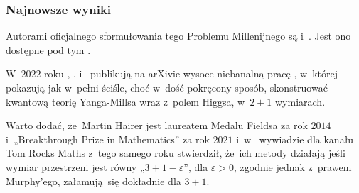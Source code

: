 \documentclass[10pt,t]{beamer}
\begin{document}
\begin{frame}
  \frametitle{Najnowsze wyniki}


  Autorami oficjalnego sformułowania tego Problemu Millenijnego
  są 
  i~.
  Jest ono dostępne pod tym
  .

  W~$2022$ roku
  ,
  ,
  i~ publikują
  na arXivie wysoce niebanalną pracę
  \parencite{Chandra-et-al-Stochastic-quantisation-of-Yang-Mills-ETC-Pub-2024},
  w~której pokazują jak w~pełni ściśle, choć w~dość pokręcony sposób,
  skonstruować kwantową teorię Yanga-Millsa wraz z~polem Higgsa, w~$2 + 1$
  wymiarach.

  Warto dodać, że~Martin Hairer jest laureatem Medalu Fieldsa za rok $2014$
  i~„Breakthrough Prize in Mathematics” za rok $2021$
  i~w~
  {wywiadzie} dla kanału Tom Rocks Maths z~tego samego roku stwierdził,
  że~ich metody działają jeśli wymiar przestrzeni jest równy
  „$3 + 1 - \varepsilon$”, dla $\varepsilon > 0$, zgodnie jednak z~prawem Murphy’ego,
  załamują~się dokładnie dla $3 + 1$.

\end{frame}
\end{document}
